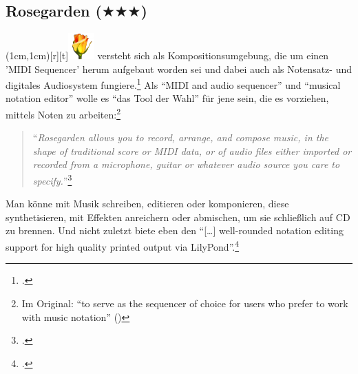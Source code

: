 %
%


\subsection{Rosegarden ($\bigstar\bigstar\bigstar$)}

\parpic(1cm,1cm)[r][t]{\includegraphics[width=1cm]{logos/rosegarden-300dpi.png}}
\label{Rosegarden} versteht sich als Kompositionsumgebung, die
um einen 'MIDI Sequencer' herum aufgebaut worden sei und dabei auch als
Notensatz- und digitales Audiosystem fungiere.\footcite[vgl.][\nopage
wp.]{Rosegarden2019a} Als \enquote{MIDI and audio sequencer} und \enquote{musical
notation editor} wolle es \enquote{das Tool der Wahl} für jene sein, die es
vorziehen, mittels Noten zu arbeiten:\footnote{Im Original: \enquote{to serve as
the sequencer of choice for users who prefer to work with music notation}
(\cite[vgl.][\nopage wp.]{Rosegarden2019c})}

\begin{quote}\enquote{\textit{Rosegarden allows you to record, arrange, and compose
music, in the shape of traditional score or MIDI data, or of audio files either
imported or recorded from a microphone, guitar or whatever audio source you care
to specify.}}\footcite[vgl.][\nopage wp.]{Rosegarden2019c} \end{quote}

Man könne mit  Musik schreiben, editieren oder komponieren,
diese synthetisieren, mit Effekten anreichern oder abmischen, um sie schließlich
auf CD zu brennen. Und nicht zuletzt biete  eben den
\enquote{[\ldots] well-rounded notation editing support for high quality printed
output via LilyPond}.\footcite[vgl.][\nopage wp.]{Rosegarden2019c}

